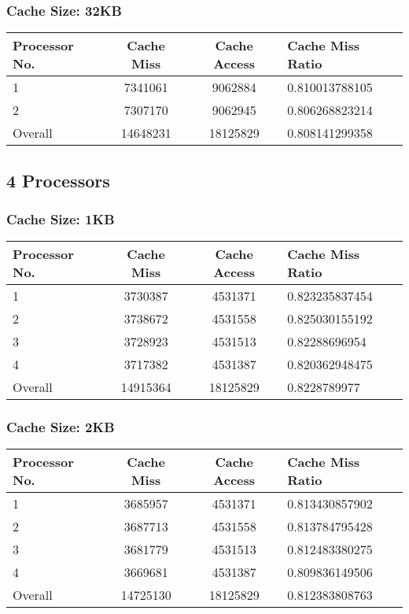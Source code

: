 \documentclass[]{article}
\begin{document}
\subsubsection{Cache Size: 32KB}
\begin{tabularx}{\textwidth}{ | l | c | c | X | }
\hline
Processor No.    & Cache Miss    & Cache Access  &   Cache Miss Ratio \\
\hline
1    & 7341061  & 9062884    & 0.810013788105 \\
\hline
2    & 7307170  & 9062945    & 0.806268823214 \\
\hline
Overall & 14648231    & 18125829  & 0.808141299358 \\
\hline
\end{tabularx}
\pagebreak


\subsection{4 Processors}
\subsubsection{Cache Size: 1KB}
\begin{tabularx}{\textwidth}{ | l | c | c | X | }
\hline
Processor No.    & Cache Miss    & Cache Access  &   Cache Miss Ratio \\
\hline
1    & 3730387  & 4531371    & 0.823235837454 \\
\hline
2    & 3738672  & 4531558    & 0.825030155192 \\
\hline
3    & 3728923  & 4531513    & 0.82288696954 \\
\hline
4    & 3717382  & 4531387    & 0.820362948475 \\
\hline
Overall & 14915364    & 18125829  & 0.8228789977 \\
\hline
\end{tabularx}


\subsubsection{Cache Size: 2KB}
\begin{tabularx}{\textwidth}{ | l | c | c | X | }
\hline
Processor No.    & Cache Miss    & Cache Access  &   Cache Miss Ratio \\
\hline
1    & 3685957  & 4531371    & 0.813430857902 \\
\hline
2    & 3687713  & 4531558    & 0.813784795428 \\
\hline
3    & 3681779  & 4531513    & 0.812483380275 \\
\hline
4    & 3669681  & 4531387    & 0.809836149506 \\
\hline
Overall & 14725130    & 18125829  & 0.812383808763 \\
\hline
\end{tabularx}
\end{document}

